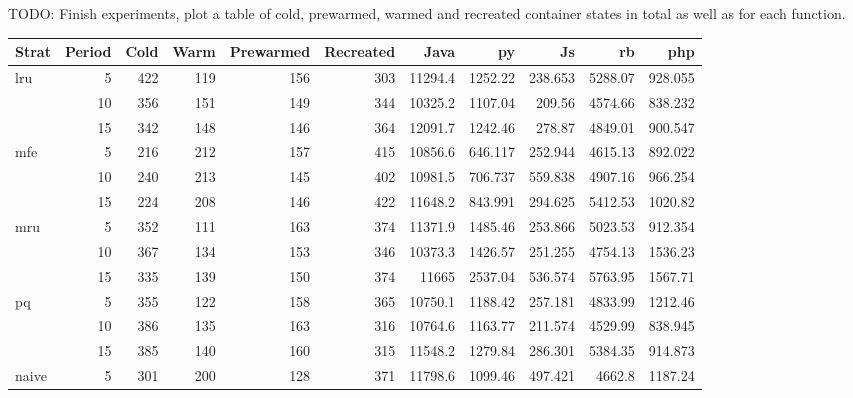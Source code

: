 \documentclass{article}
\begin{document}
TODO: Finish experiments, plot a table of cold, prewarmed, warmed and recreated container states in total as well as for each function.

\begin{table}
    \centering
\begin{tabular}{lrrrrrrrrrr}
    \hline
     Strat   &   Period &   Cold &   Warm &   Prewarmed &   Recreated &    Java &       py &      Js &      rb &      php \\
    \hline
     \multirow{3}{*}{lru}     &        5 &    422 &    119 &         156 &         303 & 11294.4 & 1252.22  & 238.653 & 5288.07 &  928.055 \\
          &       10 &    356 &    151 &         149 &         344 & 10325.2 & 1107.04  & 209.56  & 4574.66 &  838.232 \\
          &       15 &    342 &    148 &         146 &         364 & 12091.7 & 1242.46  & 278.87  & 4849.01 &  900.547 \\
    \multirow{3}{*}{mfe}     &        5 &    216 &    212 &         157 &         415 & 10856.6 &  646.117 & 252.944 & 4615.13 &  892.022 \\
          &       10 &    240 &    213 &         145 &         402 & 10981.5 &  706.737 & 559.838 & 4907.16 &  966.254 \\
          &       15 &    224 &    208 &         146 &         422 & 11648.2 &  843.991 & 294.625 & 5412.53 & 1020.82  \\
    \multirow{3}{*}{mru}     &        5 &    352 &    111 &         163 &         374 & 11371.9 & 1485.46  & 253.866 & 5023.53 &  912.354 \\
          &       10 &    367 &    134 &         153 &         346 & 10373.3 & 1426.57  & 251.255 & 4754.13 & 1536.23  \\
          &       15 &    335 &    139 &         150 &         374 & 11665   & 2537.04  & 536.574 & 5763.95 & 1567.71  \\
    \multirow{3}{*}{pq}     &        5 &    355 &    122 &         158 &         365 & 10750.1 & 1188.42  & 257.181 & 4833.99 & 1212.46  \\
          &       10 &    386 &    135 &         163 &         316 & 10764.6 & 1163.77  & 211.574 & 4529.99 &  838.945 \\
          &       15 &    385 &    140 &         160 &         315 & 11548.2 & 1279.84  & 286.301 & 5384.35 &  914.873 \\
     naive   &        5 &    301 &    200 &         128 &         371 & 11798.6 & 1099.46  & 497.421 & 4662.8  & 1187.24  \\
    \hline
\end{tabular}
\end{table}
\end{document}
